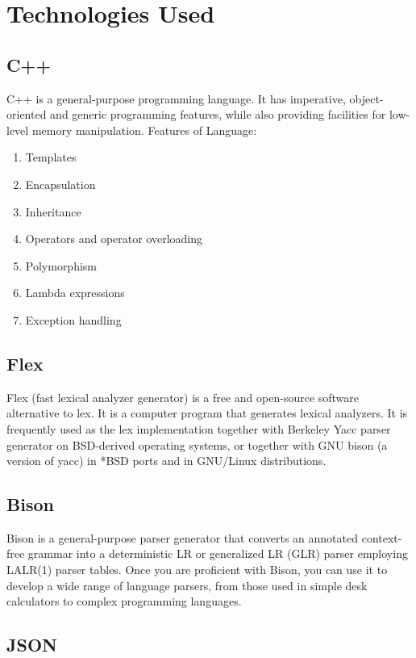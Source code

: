 \documentclass[12pt]{report}
\let\Oldsubsection\subsection
\renewcommand{\subsection}{\FloatBarrier\Oldsubsection}
\begin{document}
\section{Technologies Used}
\subsection{C++}
C++ is a general-purpose programming language. It has imperative, object-oriented and generic programming features, while also providing facilities for low-level memory manipulation.
Features of Language:
\begin{enumerate}
	\item Templates
	\item Encapsulation
	\item Inheritance
	\item Operators and operator overloading
	\item Polymorphism
	\item Lambda expressions
	\item Exception handling
\end{enumerate}

\subsection{Flex}
Flex (fast lexical analyzer generator) is a free and open-source software alternative to lex. It is a computer program that generates lexical analyzers. It is frequently used as the lex implementation together with Berkeley Yacc parser generator on BSD-derived operating systems, or together with GNU bison (a version of yacc) in *BSD ports and in GNU/Linux distributions.

\subsection{Bison}

Bison is a general-purpose parser generator that converts an annotated context-free grammar into a deterministic LR or generalized LR (GLR) parser employing LALR(1) parser
tables.
Once you are proficient with Bison, you can use it to develop a wide range of language parsers, from those used in simple desk calculators to complex programming languages.

\subsection{JSON}
\end{document}
